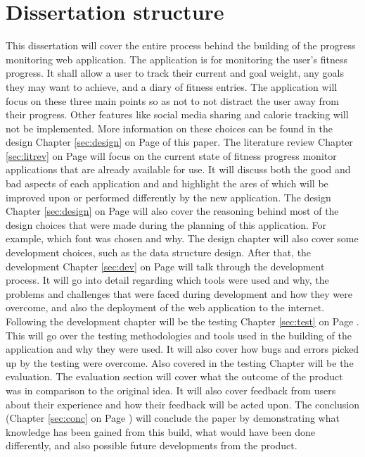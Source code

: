 \section{Dissertation structure}
This dissertation will cover the entire process behind the building of the progress monitoring web application. The application is for monitoring the user's fitness progress. It shall allow a user to track their current and goal weight, any goals they may want to achieve, and a diary of fitness entries. The application will focus on these three main points so as not to not distract the user away from their progress. Other features like social media sharing and calorie tracking will not be implemented. More information on these choices can be found in the design Chapter \ref{sec:design} on Page \pageref{sec:design} of this paper. The literature review Chapter \ref{sec:litrev} on Page \pageref{sec:litrev} will focus on the current state of fitness progress monitor applications that are already available for use. It will discuss both the good and bad aspects of each application and and highlight the ares of which will be improved upon or performed differently by the new application. The design Chapter \ref{sec:design} on Page \pageref{sec:design} will also cover the reasoning behind most of the design choices that were made during the planning of this application. For example, which font was chosen and why. The design chapter will also cover some development choices, such as the data structure design. After that, the development Chapter \ref{sec:dev} on Page \pageref{sec:dev} will talk through the development process. It will go into detail regarding which tools were used and why, the problems and challenges that were faced during development and how they were overcome, and also the deployment of the web application to the internet. Following the development chapter will be the testing Chapter \ref{sec:test} on Page \pageref{sec:test}. This will go over the testing methodologies and tools used in the building of the application and why they were used. It will also cover how bugs and errors picked up by the testing were overcome. Also covered in the testing Chapter will be the evaluation. The evaluation section will cover what the outcome of the product was in comparison to the original idea. It will also cover feedback from users about their experience and how their feedback will be acted upon. The conclusion (Chapter \ref{sec:conc} on Page \pageref{sec:conc}) will conclude the paper by demonstrating what knowledge has been gained from this build, what would have been done differently, and also possible future developments from the product.\\

